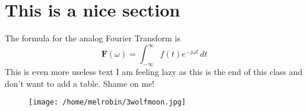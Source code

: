 \documentclass{article}
\begin{document}
\section{This is a nice section}
The formula for the analog Fourier Transform is 
\begin{equation*}
\mathbf F(\omega)=\int_{-\infty}^\infty f(t)e^{-j\omega t}\,dt
\end{equation*}
This is even more useless text
I am feeling lazy as this is the end of this class and don't want to add a table.  Shame on me!
\begin{figure}[h]
\texttt{[image: /home/melrobin/3wolfmoon.jpg]}
\end{figure}
\end{document}
